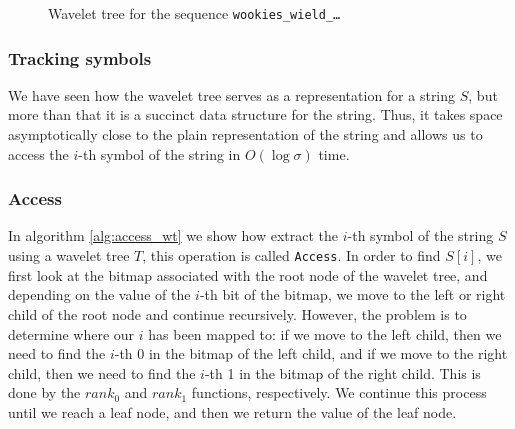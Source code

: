 \begin{figure}[h]
    \caption{\small Wavelet tree for the sequence \texttt{wookies\_wield\_\dots}} \label{fig:wavelet_tree_example}
\end{figure}

\subsubsection*{Tracking symbols}
We have seen how the wavelet tree serves as a representation for a string $S$, but more than that it is a succinct data structure for the string. Thus, it takes space asymptotically close to the plain representation of the string and allows us to access the $i$-th symbol of the string in $O(\log \sigma)$ time.

\subsubsection{Access}
In algorithm \ref{alg:access_wt} we show how extract the $i$-th symbol of the string $S$ using a wavelet tree $T$, this operation is called \texttt{Access}. In order to find $S[i]$, we first look at the bitmap associated with the root node of the wavelet tree, and depending on the value of the $i$-th bit of the bitmap, we move to the left or right child of the root node and continue recursively. However, the problem is to determine where our $i$ has been mapped to: if we move to the left child, then we need to find the $i$-th 0 in the bitmap of the left child, and if we move to the right child, then we need to find the $i$-th 1 in the bitmap of the right child. This is done by the $rank_0$ and $rank_1$ functions, respectively. We continue this process until we reach a leaf node, and then we return the value of the leaf node.

